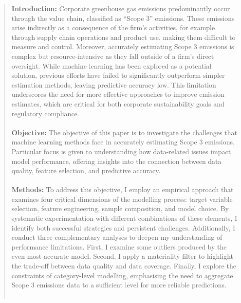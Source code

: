 \documentclass[12pt,twoside]{report}
\date{October 2024}
\begin{document}



\clearpage{\pagestyle{empty}\cleardoublepage}
\setcounter{page}{1}
\pagestyle{fancy}

\begin{abstract}

\textbf{Introduction: }Corporate greenhouse gas emissions predominantly occur through the value chain, classified as ``Scope 3'' emissions. These emissions arise indirectly as a consequence of the firm's activities, for example through supply chain operations and product use, making them difficult to measure and control. Moreover, accurately estimating Scope 3 emissions is complex but resource-intensive as they fall outside of a firm's direct oversight. While machine learning has been explored as a potential solution, previous efforts have failed to significantly outperform simpler estimation methods, leaving predictive accuracy low. This limitation underscores the need for more effective approaches to improve emission estimates, which are critical for both corporate sustainability goals and regulatory compliance.
\\\\
\textbf{Objective: }The objective of this paper is to investigate the challenges that machine learning methods face in accurately estimating Scope 3 emissions. Particular focus is given to understanding how data-related issues impact model performance, offering insights into the connection between data quality, feature selection, and predictive accuracy. 
\\\\
\textbf{Methods: }To address this objective, I employ an empirical approach that examines four critical dimensions of the modelling process: target variable selection, feature engineering, sample composition, and model choice. By systematic experimentation with different combinations of these elements, I identify both successful strategies and persistent challenges. Additionally, I conduct three complementary analyses to deepen my understanding of performance limitations. First, I examine some outliers produced by the even most accurate model. Second, I apply a materiality filter to highlight the trade-off between data quality and data coverage. Finally, I explore the constraints of category-level modelling, emphasising the need to aggregate Scope 3 emissions data to a sufficient level for more reliable predictions.
\\\\

\end{abstract}
\end{document}
